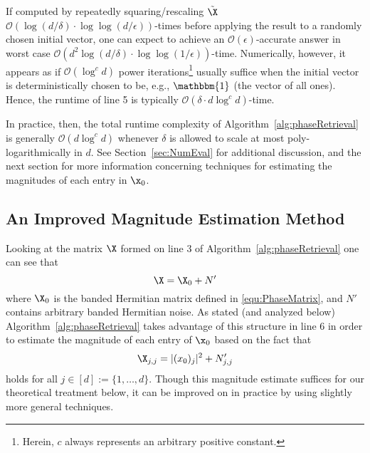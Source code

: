 If computed by repeatedly squaring/rescaling $\tilde{\X}$ $\mathcal{O} \left(\log (d/\delta) \cdot \log \log (d/\epsilon)  \right)$-times before applying the result to a randomly chosen initial vector, one can expect to achieve an $\mathcal{O}(\epsilon)$-accurate answer in worst case $\mathcal{O}(d^2 \log (d/\delta) \cdot \log \log (1/\epsilon) )$-time.  Numerically, however, it appears as if $\mathcal{O}(\log^c d)$ power iterations\footnote{Herein, $c$ always represents an arbitrary positive constant.} usually suffice when the initial vector is deterministically chosen to be, e.g., $\mathbbm{1}$ (the vector of all ones).  Hence, the runtime of line 5 is typically $\mathcal{O}(\delta \cdot d \log^c d )$-time.  

In practice, then, the total runtime complexity of Algorithm~\ref{alg:phaseRetrieval} is generally $\mathcal{O}(d \log^c d)$ whenever $\delta$ is allowed to scale at most poly-logarithmically in $d$.  See Section~\ref{sec:NumEval} for additional discussion, and the next section for more information concerning techniques for estimating the magnitudes of each entry in $\x_0$.

\subsection{An Improved Magnitude Estimation Method}

Looking at the matrix $\X$ formed on line 3 of Algorithm~\ref{alg:phaseRetrieval} one can see that
$$\X= \X_0 + N'$$
where $\X_0$ is the banded Hermitian matrix defined in \eqref{equ:PhaseMatrix}, and $N'$ contains arbitrary banded Hermitian noise.  As stated (and analyzed below) Algorithm~\ref{alg:phaseRetrieval} takes advantage of this structure in line 6 in order to estimate the magnitude of each entry of $\x_0$ based on the fact that 
$$\X_{j,j} = |(x_0)_{j}|^2 + N'_{j,j}$$
holds for all $j \in [d] := \{ 1, \dots, d\}$.  Though this magnitude estimate suffices for our theoretical treatment below, it can be improved on in practice by using slightly more general techniques.

